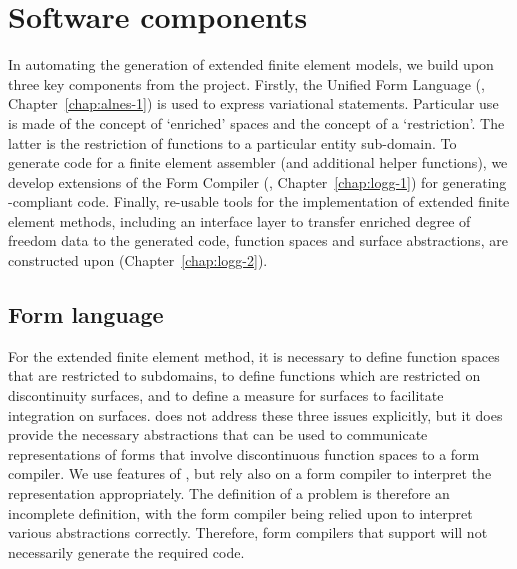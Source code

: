 \section{Software components}

In automating the generation of extended finite element models, we
build upon three key components from the \fenics{} project. Firstly,
the Unified Form Language (\ufl{}, Chapter~\ref{chap:alnes-1}) is used to
express variational statements. Particular use is made of the concept of
`enriched' spaces and the \ufl{} concept of a `restriction'. The latter
is the restriction of functions to a particular entity sub-domain.
To generate code for a finite element assembler (and additional helper
functions), we develop extensions of the \fenics{} Form Compiler (\ffc{},
Chapter~\ref{chap:logg-1}) for generating \ufc{}-compliant code. Finally,
re-usable tools for the implementation of extended finite element methods,
including an interface layer to transfer enriched degree of freedom
data to the generated code, function spaces and surface abstractions,
are constructed upon \dolfin{} (Chapter~\ref{chap:logg-2}).
\subsection{Form language}

For the extended finite element method, it is necessary to define
function spaces that are restricted to subdomains, to define
functions which are restricted on discontinuity surfaces, and to define a
measure for surfaces to facilitate integration on surfaces.  \ufl{}
does not address these three issues explicitly, but it does provide the
necessary abstractions that can be used to communicate representations of
forms that involve discontinuous function spaces to a form compiler. We
use features of \ufl{}, but rely also on a form compiler to interpret
the \ufl{} representation appropriately.  The \ufl{} definition of a
problem is therefore an incomplete definition, with the form compiler
being relied upon to interpret various abstractions correctly. Therefore,
form compilers that support \ufl{} will not necessarily generate the
required code.

